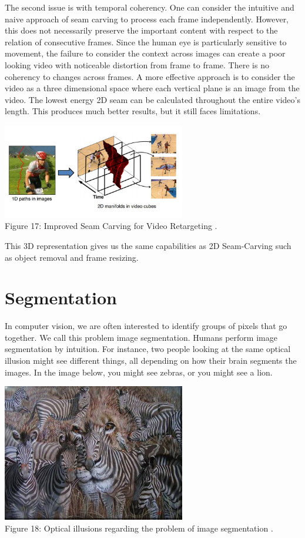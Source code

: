\documentclass{article}
\begin{document}
The second issue is with temporal coherency. One can consider the intuitive and naive approach of seam carving to process each frame independently. However, this does not necessarily preserve the important content with respect to the relation of consecutive frames. Since the human eye is particularly sensitive to movement, the failure to consider the context across images can create a poor looking video with noticeable distortion from frame to frame. There is no coherency to changes across frames. A more effective approach is to consider the video as a three dimensional space where each vertical plane is an image from the video. The lowest energy 2D seam can be calculated throughout the entire video's length. This produces much better results, but it still faces limitations.
\begin{center}
\includegraphics[width=8cm]{video_retargeting.JPG} \\
Figure 17: Improved Seam Carving for Video Retargeting \cite{rubinstein2008improved}.
\end{center}

This 3D representation gives us the same capabilities as 2D Seam-Carving such as object removal and frame resizing.
\section{Segmentation}
In computer vision, we are often interested to identify groups of pixels that go together. We call this problem image segmentation. Humans perform image segmentation by intuition. For instance, two people looking at the same optical illusion might see different things, all depending on how their brain segments the images. In the image below, you might see zebras, or you might see a lion.
\begin{center}
\includegraphics[width=8cm]{lion.jpg} \\
Figure 18: Optical illusions regarding the problem of image segmentation \cite{illusion}.
\end{center}
\end{document}
